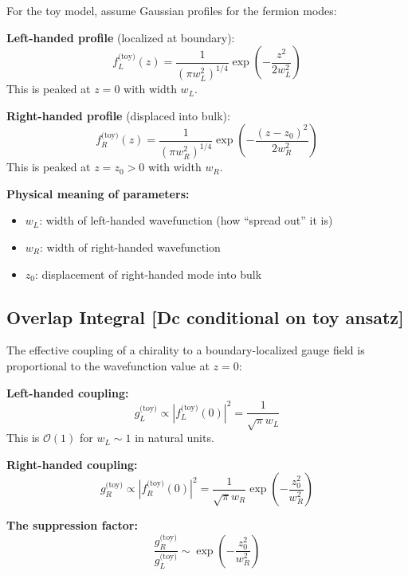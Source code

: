 For the toy model, assume Gaussian profiles for the fermion modes:

\textbf{Left-handed profile} (localized at boundary):
\begin{equation}
    f_L^{\text{(toy)}}(z) = \frac{1}{(\pi w_L^2)^{1/4}} \exp\left(-\frac{z^2}{2w_L^2}\right)
    \label{eq:ch9_toy_fL}
\end{equation}
This is peaked at $z = 0$ with width $w_L$.

\textbf{Right-handed profile} (displaced into bulk):
\begin{equation}
    f_R^{\text{(toy)}}(z) = \frac{1}{(\pi w_R^2)^{1/4}} \exp\left(-\frac{(z - z_0)^2}{2w_R^2}\right)
    \label{eq:ch9_toy_fR}
\end{equation}
This is peaked at $z = z_0 > 0$ with width $w_R$.

\textbf{Physical meaning of parameters:}
\begin{itemize}[nosep]
    \item $w_L$: width of left-handed wavefunction (how ``spread out'' it is)
    \item $w_R$: width of right-handed wavefunction
    \item $z_0$: displacement of right-handed mode into bulk
\end{itemize}

\subsection{Overlap Integral [Dc conditional on toy ansatz]}

The effective coupling of a chirality to a boundary-localized gauge field is
proportional to the wavefunction value at $z = 0$:

\textbf{Left-handed coupling:}
\begin{equation}
    g_L^{\text{(toy)}} \propto |f_L^{\text{(toy)}}(0)|^2 = \frac{1}{\sqrt{\pi} w_L}
    \label{eq:ch9_toy_gL}
\end{equation}
This is $\mathcal{O}(1)$ for $w_L \sim 1$ in natural units.

\textbf{Right-handed coupling:}
\begin{equation}
    g_R^{\text{(toy)}} \propto |f_R^{\text{(toy)}}(0)|^2
    = \frac{1}{\sqrt{\pi} w_R} \exp\left(-\frac{z_0^2}{w_R^2}\right)
    \label{eq:ch9_toy_gR}
\end{equation}

\textbf{The suppression factor:}
\begin{equation}
    \frac{g_R^{\text{(toy)}}}{g_L^{\text{(toy)}}} \sim \exp\left(-\frac{z_0^2}{w_R^2}\right)
    \label{eq:ch9_toy_suppression}
\end{equation}


